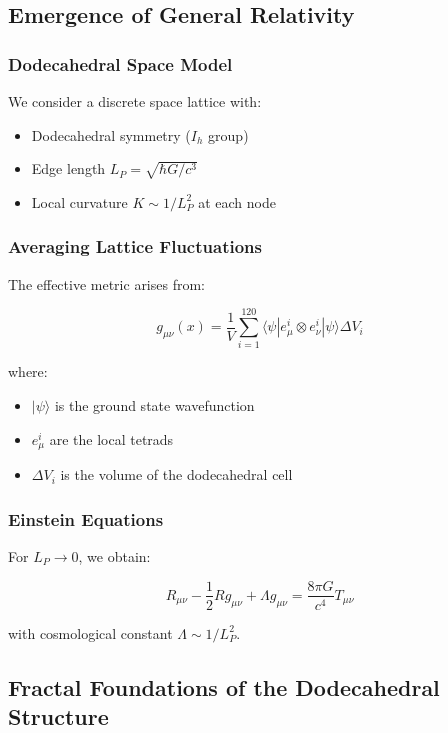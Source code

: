 \subsection{Emergence of General Relativity}  
\label{subsec:art_emergence}  

\subsubsection{Dodecahedral Space Model}  
We consider a discrete space lattice with:  
\begin{itemize}  
\item Dodecahedral symmetry ($I_h$ group)  
\item Edge length $L_P = \sqrt{\hbar G/c^3}$  
\item Local curvature $K \sim 1/L_P^2$ at each node  
\end{itemize}  

\subsubsection{Averaging Lattice Fluctuations}  
The effective metric arises from:  

\begin{equation}  
g_{\mu\nu}(x) = \frac{1}{V}\sum_{i=1}^{120} \langle \psi|e_\mu^i \otimes e_\nu^i|\psi\rangle \Delta V_i  
\end{equation}  

where:  
\begin{itemize}  
\item $|\psi\rangle$ is the ground state wavefunction  
\item $e_\mu^i$ are the local tetrads  
\item $\Delta V_i$ is the volume of the dodecahedral cell  
\end{itemize}  

\subsubsection{Einstein Equations}  
For $L_P \to 0$, we obtain:  

\begin{equation}  
R_{\mu\nu} - \frac{1}{2}Rg_{\mu\nu} + \Lambda g_{\mu\nu} = \frac{8\pi G}{c^4}T_{\mu\nu}  
\end{equation}  

with cosmological constant $\Lambda \sim 1/L_P^2$.  

\subsection{Fractal Foundations of the Dodecahedral Structure}  
\label{subsec:fractal}  

